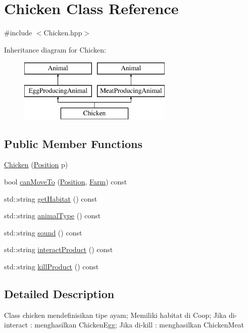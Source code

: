 \hypertarget{class_chicken}{}\section{Chicken Class Reference}
\label{class_chicken}


{\ttfamily \#include $<$Chicken.\+hpp$>$}

Inheritance diagram for Chicken\+:\begin{figure}[H]
\begin{center}
\leavevmode
\includegraphics[height=3.000000cm]{class_chicken}
\end{center}
\end{figure}
\subsection*{Public Member Functions}
\begin{DoxyCompactItemize}
\item 
\mbox{\hyperlink{class_chicken_a4f02c9fb941a36cfec565dc0b198ab3c}{Chicken}} (\mbox{\hyperlink{class_position}{Position}} p)
\item 
bool \mbox{\hyperlink{class_chicken_acfb2980acf752d7004675083b9475c28}{can\+Move\+To}} (\mbox{\hyperlink{class_position}{Position}}, \mbox{\hyperlink{class_farm}{Farm}}) const
\item 
std\+::string \mbox{\hyperlink{class_chicken_a04caa14a1505440f93e6c81a387c6f27}{get\+Habitat}} () const
\item 
std\+::string \mbox{\hyperlink{class_chicken_a95e129b0b1230bd548eba900852e4810}{animal\+Type}} () const
\item 
std\+::string \mbox{\hyperlink{class_chicken_a2ea0957d2902deeb06bb88e2a663b525}{sound}} () const
\item 
std\+::string \mbox{\hyperlink{class_chicken_abfe91af373fe0e1183cfb52f8ab4b4a0}{interact\+Product}} () const
\item 
std\+::string \mbox{\hyperlink{class_chicken_a31c3c1a46d657c0bfa45de825dc06e53}{kill\+Product}} () const
\end{DoxyCompactItemize}


\subsection{Detailed Description}
Class chicken mendefinisikan tipe ayam; Memiliki habitat di Coop; Jika di-\/interact \+: menghasilkan Chicken\+Egg; Jika di-\/kill \+: menghasilkan Chicken\+Meat 

